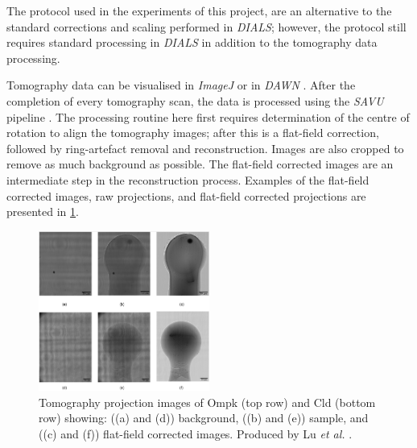 

The protocol used in the experiments of this project, are an alternative to the standard corrections and scaling performed in \textit{DIALS}; however, the protocol still requires standard processing in \textit{DIALS} in addition to the tomography data processing. 

Tomography data can be visualised in \textit{ImageJ} \cite{Schroeder2020} or in \textit{DAWN} \cite{Basham2015}. After the completion of every tomography scan, the data is processed using the \textit{SAVU} pipeline \cite{Kazantsev2022}. The processing routine here first requires determination of the centre of rotation to align the tomography images; after this is a flat-field correction, followed by ring-artefact removal and reconstruction. Images are also cropped to remove as much background as possible. The flat-field corrected images are an intermediate step in the reconstruction process. Examples of the flat-field corrected images, raw projections, and flat-field corrected projections are presented in \cref{fig:tomo projections}. 

\begin{figure}
    \centering
    \includegraphics[width = 0.5\textwidth]{images/Tomo projection images CLD and Ompk high quality.png}
    \caption{Tomography projection images of Ompk (top row) and Cld (bottom row) showing: ((a) and (d)) background,  ((b) and (e)) sample, and ((c) and (f)) flat-field corrected images. Produced by Lu \textit{et al.} \cite{Lu2024}.}
    \label{fig:tomo projections}
\end{figure}


